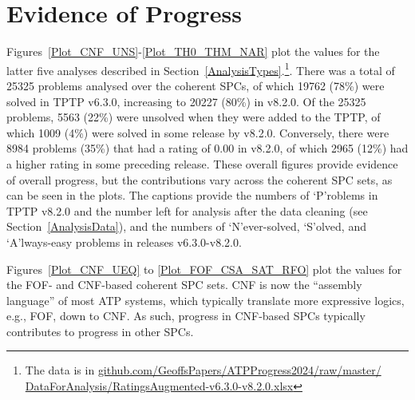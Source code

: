 \documentclass[runningheads]{llncs}
\begin{document}
\section{Evidence of Progress}
\label{Evidence}

Figures~\ref{Plot_CNF_UNS}-\ref{Plot_TH0_THM_NAR} plot the values for the latter five analyses
described in Section~\ref{AnalysisTypes}.\footnote{%
The data is in \href{https://github.com/GeoffsPapers/ATPProgress2024/raw/master/DataForAnalysis/RatingsNoMissing-v6.3.0-v8.2.0.xlsx}{github.com/GeoffsPapers/ATPProgress2024/raw/master/} 
\href{https://github.com/GeoffsPapers/ATPProgress2024/raw/master/DataForAnalysis/RatingsAugmented-v6.3.0-v8.2.0.xlsx}{DataForAnalysis/RatingsAugmented-v6.3.0-v8.2.0.xlsx}}.
There was a total of 25325 problems analysed over the coherent SPCs, of which 19762 (78\%) were 
solved in TPTP v6.3.0, increasing to 20227 (80\%) in v8.2.0.
Of the 25325 problems, 5563 (22\%) were unsolved when they were added to the TPTP, of which 1009 
(4\%) were solved in some release by v8.2.0. 
Conversely, there were 8984 problems (35\%) that had a rating of 0.00 in v8.2.0, of which 2965 
(12\%) had a higher rating in some preceding release.
These overall figures provide evidence of overall progress, but the contributions vary across
the coherent SPC sets, as can be seen in the plots.
The captions provide the numbers of `P'roblems in TPTP v8.2.0 and the number left for analysis 
after the data cleaning (see Section~\ref{AnalysisData}), and the numbers of `N'ever-solved, 
`S'olved, and `A'lways-easy problems in releases v6.3.0-v8.2.0.

Figures~\ref{Plot_CNF_UEQ} to \ref{Plot_FOF_CSA_SAT_RFO} plot the values for the FOF- and
CNF-based coherent SPC sets.
CNF is now the ``assembly language'' of most ATP systems, which typically translate more
expressive logics, e.g., FOF, down to CNF.
As such, progress in CNF-based SPCs typically contributes to progress in other SPCs.
\end{document}
